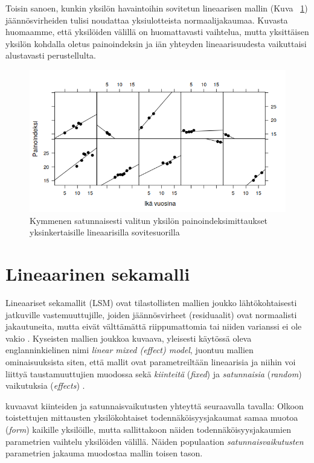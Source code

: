 \documentclass[finnish]{docopts}
\begin{document}
Toisin sanoen, kunkin yksilön havaintoihin sovitetun lineaarisen mallin (Kuva ~\ref{fig:xyplot}) jäännösvirheiden tulisi noudattaa yksiulotteista normaalijakaumaa. Kuvasta huomaamme, että yksilöiden välillä on huomattavasti vaihtelua, mutta yksittäisen yksilön kohdalla oletus painoindeksin ja iän yhteyden lineaarisuudesta vaikuttaisi alustavasti perustellulta.\\

\begin{figure}[H]
\centering
  \includegraphics[scale=0.8]{kuvaajat/xyplot.png}
  \caption{Kymmenen satunnaisesti valitun yksilön painoindeksimittaukset yksinkertaisille lineaarisilla sovitesuorilla}
  \label{fig:xyplot}
\end{figure}

\section{Lineaarinen sekamalli}
\label{sec:lsm}

Lineaariset sekamallit (LSM) ovat tilastollisten mallien joukko lähtökohtaisesti jatkuville vastemuuttujille, joiden jäännösvirheet (residuaalit) ovat normaalisti jakautuneita, mutta eivät välttämättä riippumattomia tai niiden varianssi ei ole vakio \cite{west14}. Kyseisten mallien joukkoa kuvaava, yleisesti käytössä oleva englanninkielinen nimi \textit{linear mixed (effect) model}, juontuu mallien ominaisuuksista siten, että mallit ovat parametreiltään lineaarisia ja niihin voi liittyä taustamuuttujien muodossa sekä \textit{kiinteitä} (\textit{fixed}) ja \textit{satunnaisia} (\textit{random}) vaikutuksia (\textit{effects}) \cite{west14}.

\cite{laird82} kuvaavat kiinteiden ja satunnaisvaikutusten yhteyttä seuraavalla tavalla: Olkoon toistettujen mittausten yksilökohtaiset todennäköisyysjakaumat samaa muotoa (\textit{form}) kaikille yksilöille, mutta sallittakoon näiden todennäköisyysjakaumien parametrien vaihtelu yksilöiden välillä. Näiden populaation \textit{satunnaisvaikutusten} parametrien jakauma muodostaa mallin toisen tason.
\end{document}
